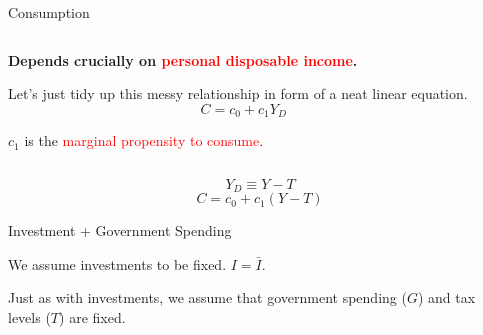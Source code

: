 \documentclass[shownotes,11pt, aspectratio=169]{beamer}
\newenvironment{wideitemize}{\itemize\addtolength{\itemsep}{10pt}}{\enditemize}
\begin{document}
\begin{frame}{Consumption}
\begin{columns}[T] %
\begin{column}{.52\textwidth}
  \begin{wideitemize}
    \item \textbf{Depends crucially on \textcolor{red}{personal disposable income}.}
    \item Let's just tidy up this messy relationship in form of a neat linear equation.
           \[ C = c_0 + c_1Y_D \]
    \item $c_1$ is the \textcolor{red}{marginal propensity to consume}.
  \end{wideitemize}
\end{column}%
\pause
\hfill%
\begin{column}{.44\textwidth}
\end{column}%
\end{columns}
\pause
\[ Y_D \equiv Y - T \]
\[ C = c_0 + c_1(Y - T) \]
\end{frame}

\begin{frame}{Investment + Government Spending}
\begin{wideitemize}
\item We assume investments to be fixed. \pause $ I = \bar{I}$.
\pause
\item Just as with investments, we assume that government spending ($G$) and tax levels ($T$) are fixed. 
\end{wideitemize}
\end{frame}
\end{document}
